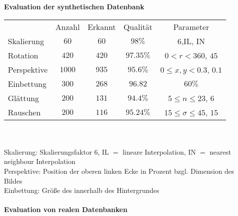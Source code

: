 \textbf{Evaluation der synthetischen Datenbank} \\
\begin{tabular}{l c c c c}
 		& Anzahl & Erkannt & Qualität & Parameter \\
		Skalierung & $60$ & $60$ & $98\%$ & $6$,IL, IN \\
		Rotation  & $420$ & $420$ & $97.35\%$ & $0<r<360$, $45$\\
		Perspektive & $1000$ & $935$ & $95.6\%$ & $0 \leq x,y<0.3$, $0.1$\\
		Einbettung & $300$ & $268$ &  $96.82$ & $60\%$\\
		Glättung & $200$ & $131$ & $94.4\%$ &  $5\leq n \leq 23$, $6$\\
		Rauschen & $200$ & $116$ & $95.24\%$ & $15 \leq \sigma \leq 45$, $15$\\
\end{tabular}
\\ \\
Skalierung: Skalierungsfaktor $6$, IL $=$ lineare Interpolation, IN $=$ nearest neighbour Interpolation\\
Perspektive: Position der oberen linken Ecke in Prozent bzgl. Dimension des Bildes \\
Einbettung: Größe des \QRCodes innerhalb des Hintergrundes \\
\\
\textbf{Evaluation von realen Datenbanken} \\

